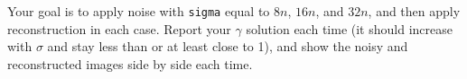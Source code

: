 \documentclass[11pt]{article}
\begin{document}
Your goal is to apply noise with \texttt{sigma} equal to $8n$, $16n$,
and $32n$, and then apply reconstruction in each case. Report your
$\gamma$ solution each time (it should increase with $\sigma$ and stay
less than or at least close to 1), and show the noisy and
reconstructed images side by side each time.
\end{document}

